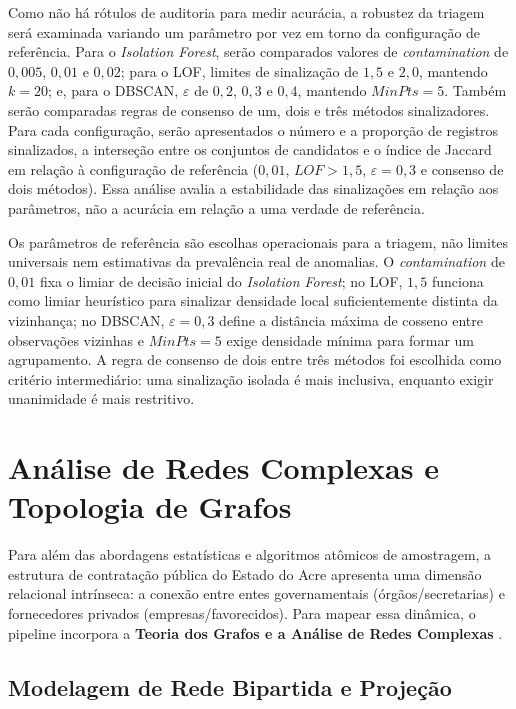 \documentclass[
    12pt,               %
    openright,          %
    oneside,            %
    a4paper,            %
    chapter=TITLE,      %
    sumario=tradicional,%
    english,            %
    brazilian,          %
 ]{abntex2}
\begin{document}
Como não há rótulos de auditoria para medir acurácia, a robustez da triagem será examinada variando um parâmetro por vez em torno da configuração de referência. Para o \textit{Isolation Forest}, serão comparados valores de \textit{contamination} de $0,005$, $0,01$ e $0,02$; para o LOF, limites de sinalização de $1,5$ e $2,0$, mantendo $k=20$; e, para o DBSCAN, $\varepsilon$ de $0,2$, $0,3$ e $0,4$, mantendo $MinPts=5$. Também serão comparadas regras de consenso de um, dois e três métodos sinalizadores. Para cada configuração, serão apresentados o número e a proporção de registros sinalizados, a interseção entre os conjuntos de candidatos e o índice de Jaccard em relação à configuração de referência ($0,01$, $LOF>1,5$, $\varepsilon=0,3$ e consenso de dois métodos). Essa análise avalia a estabilidade das sinalizações em relação aos parâmetros, não a acurácia em relação a uma verdade de referência.

Os parâmetros de referência são escolhas operacionais para a triagem, não limites universais nem estimativas da prevalência real de anomalias. O \textit{contamination} de $0,01$ fixa o limiar de decisão inicial do \textit{Isolation Forest}; no LOF, $1,5$ funciona como limiar heurístico para sinalizar densidade local suficientemente distinta da vizinhança; no DBSCAN, $\varepsilon=0,3$ define a distância máxima de cosseno entre observações vizinhas e $MinPts=5$ exige densidade mínima para formar um agrupamento. A regra de consenso de dois entre três métodos foi escolhida como critério intermediário: uma sinalização isolada é mais inclusiva, enquanto exigir unanimidade é mais restritivo.

\section{Análise de Redes Complexas e Topologia de Grafos}\label{sec:redes_complexas}

Para além das abordagens estatísticas e algoritmos atômicos de amostragem, a estrutura de contratação pública do Estado do Acre apresenta uma dimensão relacional intrínseca: a conexão entre entes governamentais (órgãos/secretarias) e fornecedores privados (empresas/favorecidos). Para mapear essa dinâmica, o pipeline incorpora a \textbf{Teoria dos Grafos e a Análise de Redes Complexas} \cite{nunes2021}.

\subsection{Modelagem de Rede Bipartida e Projeção}\label{subsec:rede_bipartida}
\end{document}
